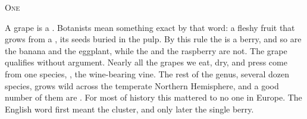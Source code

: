 \documentclass[11pt]{article}
\begin{document}
\thispagestyle{fancy}
\begin{center}{\large\scshape\color{grapeink} One}\par{}\end{center}
\bigskip
\beginnumbering
\pstart
\noindent A grape is a . Botanists mean something exact by that word: a fleshy fruit
that grows from a , its
seeds buried in the pulp. By this rule the  is a berry, and so are the banana and the eggplant, while the
 and
the raspberry are not. The grape qualifies without argument.
\pend
\pstart
Nearly all the grapes we eat, dry, and press come from one species,
, the wine-bearing vine. The rest of the genus, several
dozen species, grows wild across the temperate Northern Hemisphere, and a good
number of them are . For most of history this
mattered to no one in Europe. The English word  first meant the cluster, and only later the single berry.
\pend
\endnumbering
\end{document}
